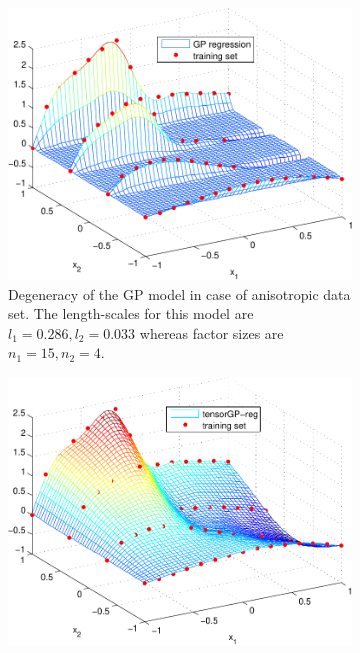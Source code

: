 \begin{figure}
  \centering
  \begin{subfigure}[b]{0.45\textwidth}
      \includegraphics[width=\textwidth]{figures/gp_on_grid/degeneration.pdf}
      \caption{Degeneracy of the GP model in case of anisotropic data set.
        The length-scales for this model are $l_1 = 0.286, l_2 = 0.033$
        whereas factor sizes are $n_1 = 15, n_2 = 4$.}
      \label{fig:anisotropy_degeneracy}
  \end{subfigure}
  \begin{subfigure}[b]{0.45\textwidth}
      \includegraphics[width=\textwidth]{figures/gp_on_grid/nondegenerate_tensorGP.pdf}

\end{subfigure}
\end{figure}
